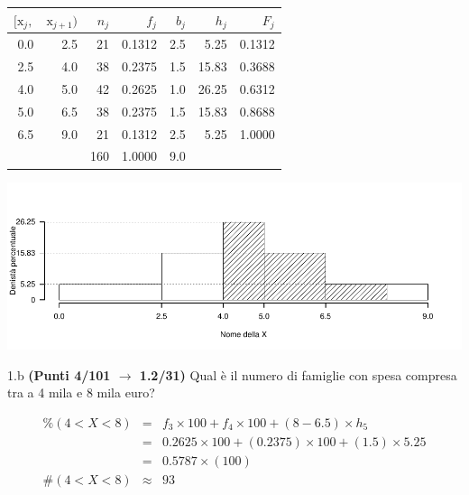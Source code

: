 \documentclass[
  11pt,
]{book}
\theoremstyle{mytheoremstyle}
\theoremstyle{mydefstyle}
\newenvironment{sol}
  {
  \begin{tcolorbox}[enhanced,breakable,arc=0.1mm,boxrule=1pt,colback=white,colframe=iblue,
  title=\bf \fontfamily{lmss}\selectfont \hspace{.5 cm} Soluzione,drop fuzzy shadow]

}{
\end{tcolorbox}
  }
\begin{document}
\begin{sol}

\begin{table}[H]
\centering
\begin{tabular}{rrrrrrr}
\toprule
$[\text{x}_j,$ & $\text{x}_{j+1})$ & $n_j$ & $f_j$ & $b_j$ & $h_j$ & $F_j$\\
\midrule
0.0 & 2.5 & 21 & 0.1312 & 2.5 & 5.25 & 0.1312\\
2.5 & 4.0 & 38 & 0.2375 & 1.5 & 15.83 & 0.3688\\
4.0 & 5.0 & 42 & 0.2625 & 1.0 & 26.25 & 0.6312\\
5.0 & 6.5 & 38 & 0.2375 & 1.5 & 15.83 & 0.8688\\
6.5 & 9.0 & 21 & 0.1312 & 2.5 & 5.25 & 1.0000\\
 &  & 160 & 1.0000 & 9.0 &  & \\
\bottomrule
\end{tabular}
\end{table}

\begin{center}\includegraphics{Esami_passati_con_soluzioni_files/figure-latex/2023-178-1} \end{center}

\end{sol}

1.b \textbf{(Punti 4/101 \(\rightarrow\) 1.2/31)} Qual è il numero di famiglie con spesa compresa tra a 4 mila e 8 mila euro?

\begin{sol}
\begin{eqnarray*} \%(4<X<8) &=&  f_{3}\times 100+ f_{ 4 }\times 100 + (8-6.5)\times h_{5}  \\ 
 &=&0.2625\times 100 + ( 0.2375 )\times 100 + (1.5)\times 5.25  \\ 
 &=&  0.5787 \times(100)\\
     \#( 4 < X < 8 ) &\approx& 93 
         \end{eqnarray*}

\end{sol}
\end{document}
